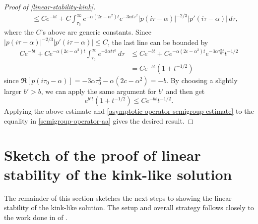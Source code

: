 \begin{proof}[Proof of \cref{linear-stability-kink}]
\begin{equation*}
\begin{aligned}
			&\quad\leq C e^{-bt} + C \int_{\tau_0}^\infty e^{- \alpha (2c - \alpha^2)t} e^{-3\alpha t \tau^2} |p(i\tau-\alpha)|^{-2/3} |p'(i\tau - \alpha)| \, d\tau,
		\end{aligned}
	\end{equation*} 
	where the \(C\)'s above are generic constants. Since \(|p(i\tau-\alpha)|^{-2/3} |p'(i\tau - \alpha)|\leq C\), the last line can be bounded by 
	\begin{equation*} 
		\begin{aligned}
			C e^{-bt} + C e^{-\alpha(2c - \alpha^2) t} \int_{\tau_0}^\infty e^{-3\alpha t \tau^2}\, d\tau &\leq C e^{-bt} + C e^{-\alpha(2c - \alpha^2) t} e^{-3\alpha \tau_0^2 t} t^{-1/2} \\
			&= C e^{-bt }( 1 + t^{-1/2})
		\end{aligned}
	\end{equation*} 
	since \(\Re [p(i\tau_0 - \alpha)] = -3\alpha \tau_0^2 - \alpha (2c - \alpha^2) = -b\). By choosing a slightly larger \(b' > b\), we can apply the same argument for \(b'\) and then get
	\begin{equation*} 
		e^{b't} ( 1 + t^{-1/2}) \leq C e^{-bt} t^{-1/2}.
	\end{equation*} 
	Applying the above estimate and \cref{asymptotic-operator-semigroup-estimate} to the equality in \cref{semigroup-operator-aa} gives the desired result.
\end{proof}

\section{Sketch of the proof of linear stability of the kink-like solution}
The remainder of this section sketches the next steps to showing the linear stability of the kink-like solution. The setup and overall strategy follows closely to the work done in  of \cite{mizumachi2013asymptotic}.

